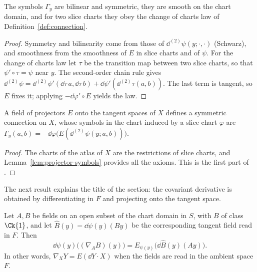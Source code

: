 \begin{lemma}
  \label{lem:projector-symbols}
  \leanok
  The symbols $\Gamma_y$ are bilinear and symmetric, they are smooth on the chart domain, and for
  two slice charts they obey the change of charts law of Definition~\ref{def:connection}.
\end{lemma}

\begin{proof}
  \leanok
  Symmetry and bilinearity come from those of $\dd^{(2)}\psi(y; \cdot, \cdot)$ (Schwarz), and
  smoothness from the smoothness of $E$ in slice charts and of $\psi$. For the change of charts
  law let $\tau$ be the transition map between two slice charts, so that $\psi' \circ \tau = \psi$
  near $y$. The second-order chain rule gives
  $\dd^{(2)}\psi = \dd^{(2)}\psi'(\dd\tau\, a, \dd\tau\, b) + \dd\psi'(\dd^{(2)}\tau(a, b))$. The
  last term is tangent, so $E$ fixes it; applying $-\dd\varphi' \circ E$ yields the law.
\end{proof}

\begin{theorem}
  \label{thm:projector-connection}
  \leanok
  A field of projectors $E$ onto the tangent spaces of $X$ defines a symmetric connection on $X$,
  whose symbols in the chart induced by a slice chart $\varphi$ are
  $\Gamma_y(a, b) = -\dd\varphi\bigl(E(\dd^{(2)}\psi(y; a, b))\bigr)$.
\end{theorem}

\begin{proof}
  \leanok
  The charts of the atlas of $X$ are the restrictions of slice charts, and
  Lemma~\ref{lem:projector-symbols} provides all the axioms. This is the first part of
  \cite[Teorema~6.6.1]{Lar26}.
\end{proof}

The next result explains the title of the section: the covariant derivative is obtained by
differentiating in $F$ and projecting onto the tangent space.

\begin{theorem}
  \label{thm:projector-derive-project}
  \leanok
  Let $A, B$ be fields on an open subset of the chart domain in $S$, with $B$ of class $\Ck{1}$,
  and let $\hat B(y) = \dd\psi(y)(B y)$ be the corresponding tangent field read in $F$. Then
  \[
    \dd\psi(y)\bigl((\nabla_A B)(y)\bigr) = E_{\psi(y)}\bigl(\dd\hat B(y)(A y)\bigr).
  \]
  In other words, $\nabla_X Y = E(\dd Y \cdot X)$ when the fields are read in the ambient
  space $F$.
\end{theorem}

